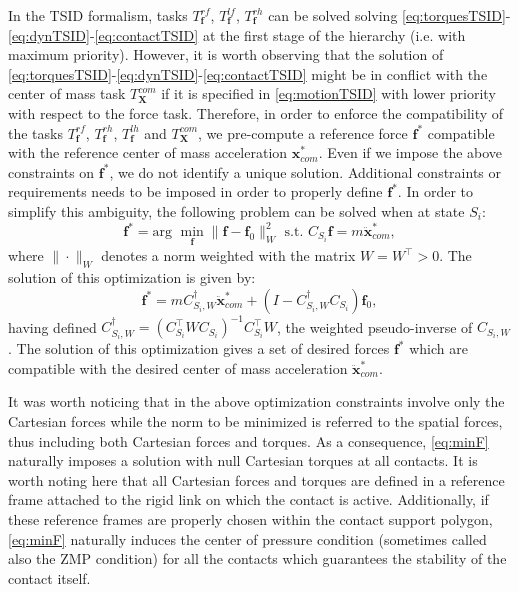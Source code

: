 \documentclass[12pt,a4paper,twoside]{article}
\begin{document}
In the TSID formalism, tasks $T^{rf}_{\bm f}$, $T^{lf}_{\bm f}$, $T^{rh}_{\bm f}$ can be solved solving \eqref{eq:torquesTSID}-\eqref{eq:dynTSID}-\eqref{eq:contactTSID} at the first stage of the hierarchy (i.e. with maximum priority). However, it is worth observing that the solution of \eqref{eq:torquesTSID}-\eqref{eq:dynTSID}-\eqref{eq:contactTSID} might be in conflict with the center of mass task $T^{com}_{\bm X}$ if it is specified in \eqref{eq:motionTSID} with lower priority with respect to the force task. Therefore, in order to enforce the compatibility of the tasks $T^{rf}_{\bm f}$, $T^{rh}_{\bm f}$, $T^{lh}_{\bm f}$ and $T^{com}_{\bm X}$, we pre-compute a  reference force $\bm f^*$ compatible with the reference center of mass acceleration $\bm x_{com}^*$. Even if we impose the above constraints on $\bm f^*$, we do not identify a unique solution. Additional constraints or requirements needs to be imposed in order to properly define $\bm f^*$. In order to simplify this ambiguity, the following problem can be solved when at state $S_i$:
\begin{equation} \label{eq:minF}
\bm f^* = \mbox{arg } \min_{\bm f} \| \bm f - \bm f_0 \|^2_W  \mbox{ s.t. } C_{S_i} \bm f= m \ddot {{\bm x}}^*_{com},
\end{equation}
where $\| \cdot \|_W$ denotes a norm weighted with the matrix $W = W^\top >0$. The solution of this optimization is given by:
\begin{equation} 
\bm f^* = m  C_{S_i, W}^\dagger \ddot {{\bm x}}_{com}^*+ (I - C_{S_i, W}^\dagger C_{S_i}) \bm f_0,
\end{equation}
having defined $C_{S_i, W}^\dagger  = \left( C_{S_i}^\top W C_{S_i} \right)^{-1} C_{S_i}^\top W$, the weighted pseudo-inverse of $C_{S_i, W}$. The solution of this optimization gives a set of desired forces $\bm f^*$ which are compatible with the desired center of mass acceleration $\ddot {\bm x}^*_{com} $. 

It was worth noticing that in the above optimization constraints involve only the Cartesian forces while the norm to be minimized is referred to the spatial forces, thus including both Cartesian forces and torques. As a consequence, \eqref{eq:minF} naturally imposes a solution with null Cartesian torques at all contacts. It is worth noting here that all Cartesian forces and torques are defined in a reference frame attached to the rigid link on which the contact is active. Additionally, if these reference frames are properly chosen within the contact support polygon, \eqref{eq:minF} naturally induces the center of pressure condition (sometimes called also the ZMP condition) for all the contacts which guarantees the stability of the contact itself.  
\end{document}
